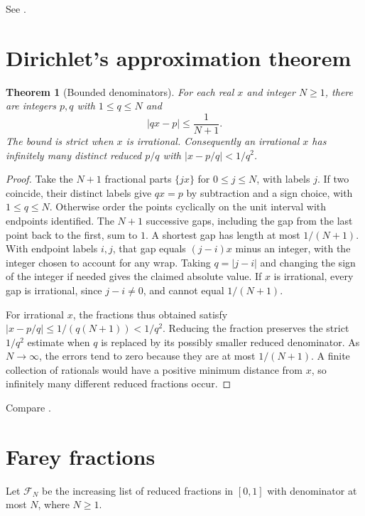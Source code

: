 \documentclass[11pt,oneside,openany]{book}
\theoremstyle{plain}
\newtheorem{theorem}{Theorem}[chapter]
\theoremstyle{definition}
\theoremstyle{remark}
\begin{document}
See \cite[\S7.5, Theorems 7.13--7.14]{nzm}.

\section{Dirichlet's approximation theorem}
\label{nt:E05}

\begin{theorem}[Bounded denominators]
For each real \(x\) and integer \(N\ge1\), there are integers \(p,q\)
with \(1\le q\le N\) and
\[
 \lvert qx-p\rvert\le\frac1{N+1}.
\]
The bound is strict when \(x\) is irrational. Consequently an irrational
\(x\) has infinitely many distinct reduced \(p/q\) with
\(\lvert x-p/q\rvert<1/q^2\).
\end{theorem}
\begin{proof}
Take the \(N+1\) fractional parts \(\{jx\}\) for \(0\le j\le N\),
with labels \(j\). If two coincide, their distinct labels give
\(qx=p\) by subtraction and a sign choice, with \(1\le q\le N\).
Otherwise order the points cyclically on the unit interval with
endpoints identified. The \(N+1\) successive gaps, including the gap
from the last point back to the first, sum to \(1\). A shortest gap
has length at most \(1/(N+1)\). With endpoint labels \(i,j\), that gap
equals \((j-i)x\) minus an integer, with the integer chosen to account
for any wrap. Taking \(q=\lvert j-i\rvert\) and changing the sign of
the integer if needed gives the claimed absolute value. If \(x\) is
irrational, every gap is irrational, since \(j-i\ne0\), and cannot
equal \(1/(N+1)\).

For irrational \(x\), the fractions thus obtained satisfy
\(\lvert x-p/q\rvert\le1/(q(N+1))<1/q^2\). Reducing the fraction
preserves the strict \(1/q^2\) estimate when \(q\) is replaced by its
possibly smaller reduced denominator. As \(N\to\infty\), the errors
tend to zero because they are at most \(1/(N+1)\). A finite collection
of rationals would have a positive minimum distance from \(x\), so
infinitely many different reduced fractions occur.
\end{proof}

Compare \cite[\S6.2, Theorems 6.8--6.9]{nzm}.

\section{Farey fractions}
\label{nt:E06}

Let \(\mathcal F_N\) be the increasing list of reduced fractions in
\([0,1]\) with denominator at most \(N\), where \(N\ge1\).
\end{document}
